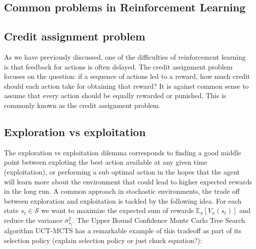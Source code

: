 \documentclass{../main.tex}{subfiles}
\begin{document}
\subsection{Common problems in Reinforcement Learning}
\subsection{Credit assignment problem}
As we have previously discussed, one of the difficulties of reinforcement learning is that feedback for actions is often delayed. The credit assignment problem focuses on the question: if a sequence of actions led to a reward, how much credit should each action take for obtaining that reward? It is against common sense to assume that every action should be equally rewarded or punished. This is commonly known as the credit assignment problem.
\subsection{Exploration vs exploitation}
The exploration vs exploitation dilemma corresponds to finding a good middle point between exploting the best action available at any given time (exploitation), or performing a sub optimal action in the hopes that the agent will learn more about the environment that could lead to higher expected rewards in the long run. A common approach in stochastic environments, the trade off between exploration and exploitation is tackled by the following idea. For each state $s_t \in \mathcal{S}$ we want to maximize the expected sum of rewards $\mathbb{E}_{\pi}[V_{\pi}(s_t)]$ and reduce the variance $\sigma^2_{s_t}$. The Upper Bound Confidence Monte Carlo Tree Search algorithm UCT-MCTS has a remarkable example of this tradeoff as part of its selection policy (explain selection policy or just chuck equation?):
\end{document}
